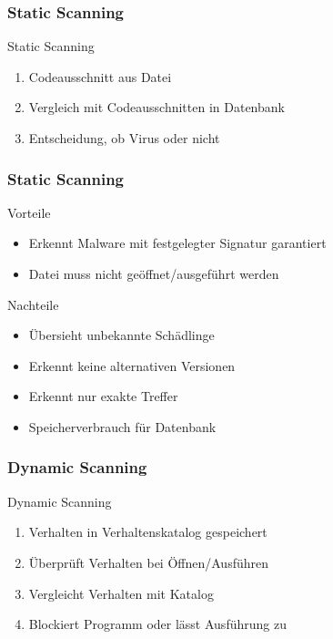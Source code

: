 \documentclass{beamer}
\begin{document}
\begin{frame}
\frametitle{Static Scanning}
\begin{block}{Static Scanning}
	\begin{enumerate}
		\item Codeausschnitt aus Datei
		\item Vergleich mit Codeausschnitten in Datenbank
		\item Entscheidung, ob Virus oder nicht
	\end{enumerate}
\end{block} 
\end{frame}

\begin{frame}
	\frametitle{Static Scanning}
	\begin{block}{Vorteile}
		\begin{itemize}
			\item Erkennt Malware mit festgelegter Signatur garantiert
			\item Datei muss nicht geöffnet/ausgeführt werden
		\end{itemize}
	\end{block} 
	\begin{block}{Nachteile}
		\begin{itemize}
			\item Übersieht unbekannte Schädlinge
			\item Erkennt keine alternativen Versionen
			\item Erkennt nur exakte Treffer
			\item Speicherverbrauch für Datenbank
		\end{itemize}
	\end{block}
\end{frame}

\begin{frame}
\frametitle{Dynamic Scanning}
\begin{block}{Dynamic Scanning}
	\begin{enumerate}
		\item Verhalten in Verhaltenskatalog gespeichert
		\item Überprüft Verhalten bei Öffnen/Ausführen
		\item Vergleicht Verhalten mit Katalog
		\item Blockiert Programm oder lässt Ausführung zu
	\end{enumerate}
	
\end{block} 
\end{frame}
\end{document}

